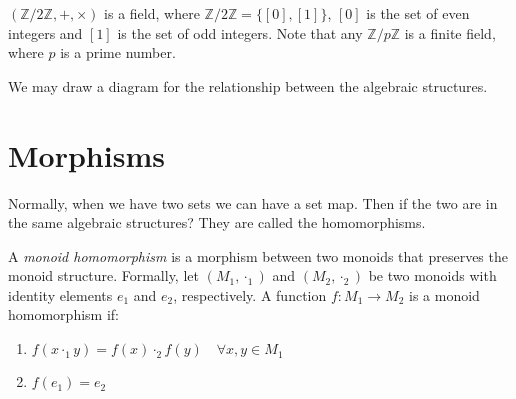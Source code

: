 \documentclass[
	11pt, %
	fleqn, %
	a4paper, %
]{LegrandOrangeBook}
\begin{document}
\begin{example}
    $(\mathbb{Z}/2\mathbb{Z}, +, \times)$ is a field, where $\mathbb{Z}/2\mathbb{Z} = \{[0], [1]\}$, $[0]$ is the set of even integers and $[1]$ is the set of odd integers. Note that any $\mathbb{Z}/p\mathbb{Z}$ is a finite field, where $p$ is a prime number.
\end{example}

We may draw a diagram for the relationship between the algebraic structures.

\begin{center}
\end{center}

\newpage

\section{Morphisms}

Normally, when we have two sets we can have a set map. Then if the two are in the same algebraic structures? They are called the homomorphisms.

\begin{definition}
    A \emph{monoid homomorphism} is a morphism between two monoids that preserves the monoid structure. Formally, let $(M_1, \cdot_1)$ and $(M_2, \cdot_2)$ be two monoids with identity elements $e_1$ and $e_2$, respectively. A function $f: M_1 \to M_2$ is a monoid homomorphism if:
    \begin{enumerate}
        \item $f(x \cdot_1 y) = f(x) \cdot_2 f(y) \quad \forall x, y \in M_1$
        \item $f(e_1) = e_2$
    \end{enumerate}
\end{definition}
\end{document}
